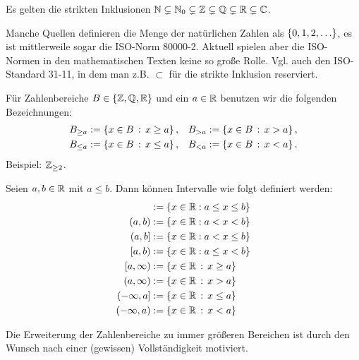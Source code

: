 \begin{bem}
	Es gelten die strikten Inklusionen
$ \mathbb{N} \subsetneq \mathbb{N}_0 \subsetneq \mathbb{Z} \subsetneq \mathbb{Q} \subsetneq \mathbb{R} \subsetneq \mathbb{C} $. 
 \end{bem} 

\begin{bem}
	Manche Quellen definieren die Menge der natürlichen Zahlen als $ \left\{ 0,1,2,\ldots \right\} $, es ist mittlerweile sogar die ISO-Norm 80000-2. Aktuell spielen aber die ISO-Normen in den mathematischen Texten keine so große Rolle. Vgl. auch den ISO-Standard 31-11, in dem man z.B. $\subset$ für die strikte Inklusion reserviert. 
\end{bem}


\begin{bem}
	Für Zahlenbereiche $B  \in \{\mathbb{Z},  \mathbb{Q}, \mathbb{R}\}$ und ein $a \in \mathbb{R}$ benutzen wir die folgenden Bezeichnungen:
	\begin{align*}
			B_{\ge a}&  := \left\{ x \in B \,:\, x \ge a \right\},  &  B_{>a} & := \left\{ x \in B \,:\, x > a \right\}, 
			\\ B_{\le a} & := \left\{ x \in B \,:\, x \le a \right\}, &  B_{<a} & := \left\{ x \in B \,:\, x < a \right\}. 
	\end{align*} 
	Beispiel: $\mathbb{Z}_{\ge 2}$. 
\end{bem} 


\begin{bem}[Intervalle]
	Seien $ a,b \in \mathbb{R} $ mit $ a \leq b $. Dann können Intervalle wie folgt definiert werden:
	\begin{align*}
		[a,b] &:= \{ x \in \R : a \leq x \leq b \}\\
		(a,b) &:= \{ x \in \R : a < x < b \}\\
		(a,b] &:= \{ x \in \R : a < x \leq b \}\\
		[a,b) &:= \{ x \in \R : a \leq x < b \} \\
		[a,\infty) & := \setcond{x \in \R}{x \ge a} \\
		(a,\infty) &:= \setcond{x \in \R}{x > a} \\ 
		(-\infty,a] &:= \setcond{x \in \R}{x \le a} \\
		(-\infty,a) &:= \setcond{x \in \R}{x < a}
	\end{align*}
\end{bem}


\begin{bem}
		Die Erweiterung der  Zahlenbereiche zu immer größeren Bereichen ist durch den Wunsch nach einer (gewissen) Vollständigkeit motiviert.
\end{bem} 


